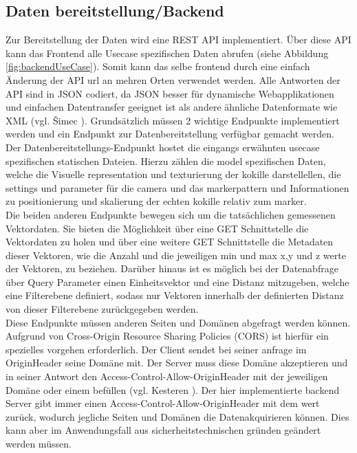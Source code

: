 \subsection{Daten bereitstellung/Backend}

Zur Bereitstellung der Daten wird eine REST API implementiert. Über diese API kann das 
Frontend alle Usecase spezifischen Daten abrufen (siehe Abbildung \ref{fig:backendUseCase}). Somit kann das selbe frontend durch eine einfach Änderung der API url an mehren Orten verwendet werden. Alle Antworten der API sind in JSON codiert, da JSON besser für dynamische Webapplikationen und einfachen Datentransfer geeignet ist als andere ähnliche Datenformate wie XML (vgl. Šimec \cite{comparisonJsonXml}).
Grundsätzlich müssen 2 wichtige Endpunkte implementiert werden und ein Endpunkt zur Datenbereitstellung verfügbar gemacht werden.\\
Der Datenbereitstellungs-Endpunkt hostet die eingangs erwähnten usecase spezifischen statischen Dateien. Hierzu zählen die model spezifischen Daten, welche die Visuelle representation und texturierung der kokille darstellellen, die settings und parameter für die camera und das markerpattern und Informationen zu positionierung und skalierung der echten kokille relativ zum marker.\\
Die beiden anderen Endpunkte bewegen sich um die tatsächlichen gemessenen Vektordaten. Sie bieten die Möglichkeit über eine GET Schnittstelle die Vektordaten zu holen und über eine weitere GET Schnittstelle die Metadaten dieser Vektoren, wie die Anzahl und die jeweiligen min und max x,y und z werte der Vektoren, zu beziehen. Darüber hinaus ist es möglich bei der Datenabfrage über Query Parameter einen Einheitsvektor und eine Distanz mitzugeben, welche eine Filterebene definiert, sodass nur Vektoren innerhalb der definierten Distanz von dieser Filterebene zurückgegeben werden.\\
Diese Endpunkte müssen anderen Seiten und Domänen abgefragt werden können. Aufgrund von Cross-Origin Resource Sharing Policies (CORS) ist hierfür ein spezielles vorgehen erforderlich. Der Client sendet bei seiner anfrage im \grqq Origin\grqq\space Header seine Domäne mit. Der Server muss diese Domäne akzeptieren und in seiner Antwort den \grqq Access-Control-Allow-Origin\grqq\space Header mit der jeweiligen Domäne oder einem \grqq *\grqq\space befüllen (vgl. Kesteren \cite{van2014cross}). Der hier implementierte backend Server gibt immer einen \grqq Access-Control-Allow-Origin\grqq\space Header mit dem wert \grqq *\grqq\space zurück, wodurch jegliche Seiten und Domänen die Datenakquirieren können. Dies kann aber im Anwendungsfall aus sicherheitstechnischen gründen geändert werden müssen.


